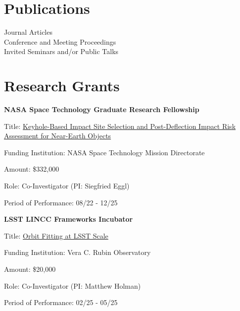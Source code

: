 \documentclass[margin,line]{res}
\newlength{\myitemspacing}
\newenvironment{list_new}{
    \begin{list}{\scriptsize{$\bullet$}}{%
        \setlength{\itemsep}{0in}
        \setlength{\parsep}{\myitemspacing} \setlength{\parskip}{0in}
        \setlength{\topsep}{0in} \setlength{\partopsep}{0in} 
        \setlength{\leftmargin}{0.2in}
        }}
    {\end{list}
}
\begin{document}
\begin{resume}
\section{\sc Publications}
 Journal Articles\\
 Conference and Meeting Proceedings\\
 Invited Seminars and/or Public Talks

\section{\sc Research Grants}
{\bf NASA Space Technology Graduate Research Fellowship}
\begin{list_new}
    \item Title: \href{https://techport.nasa.gov/projects/118462}{Keyhole-Based Impact Site Selection and Post-Deflection Impact Risk Assessment for Near-Earth Objects}
    \item Funding Institution: NASA Space Technology Mission Directorate
    \item Amount: \$332,000
    \item Role: Co-Investigator (PI: Siegfried Eggl)
    \item Period of Performance: 08/22 - 12/25
\end{list_new}

{\bf LSST LINCC Frameworks Incubator}
\begin{list_new}
    \item Title: \href{https://lsstdiscoveryalliance.org/programs/lincc-frameworks/incubator-awardees/#holman}{Orbit Fitting at LSST Scale}
    \item Funding Institution: Vera C. Rubin Observatory
    \item Amount: \$20,000 %
    \item Role: Co-Investigator (PI: Matthew Holman)
    \item Period of Performance: 02/25 - 05/25
\end{list_new}


\end{resume}
\end{document}
